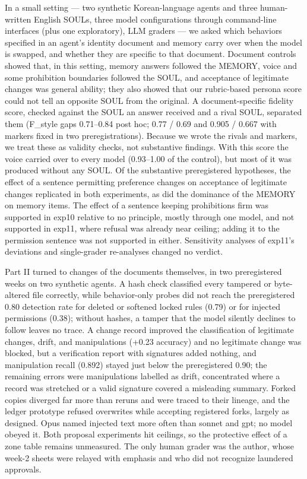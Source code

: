 \documentclass[10pt]{article}
\begin{document}
In a small setting --- two synthetic Korean-language agents and three human-written English SOULs, three model configurations through command-line interfaces (plus one exploratory), LLM graders --- we asked which behaviors specified in an agent's identity document and memory carry over when the model is swapped, and whether they are specific to that document. Document controls showed that, in this setting, memory answers followed the MEMORY, voice and some prohibition boundaries followed the SOUL, and acceptance of legitimate changes was general ability; they also showed that our rubric-based persona score could not tell an opposite SOUL from the original. A document-specific fidelity score, checked against the SOUL an answer received and a rival SOUL, separated them (F\_style gaps 0.71--0.84 post hoc; 0.77 / 0.69 and 0.905 / 0.667 with markers fixed in two preregistrations). Because we wrote the rivals and markers, we treat these as validity checks, not substantive findings. With this score the voice carried over to every model (0.93--1.00 of the control), but most of it was produced without any SOUL. Of the substantive preregistered hypotheses, the effect of a sentence permitting preference changes on acceptance of legitimate changes replicated in both experiments, as did the dominance of the MEMORY on memory items. The effect of a sentence keeping prohibitions firm was supported in exp10 relative to no principle, mostly through one model, and not supported in exp11, where refusal was already near ceiling; adding it to the permission sentence was not supported in either. Sensitivity analyses of exp11's deviations and single-grader re-analyses changed no verdict.

Part II turned to changes of the documents themselves, in two preregistered weeks on two synthetic agents. A hash check classified every tampered or byte-altered file correctly, while behavior-only probes did not reach the preregistered 0.80 detection rate for deleted or softened locked rules (0.79) or for injected permissions (0.38); without hashes, a tamper that the model silently declines to follow leaves no trace. A change record improved the classification of legitimate changes, drift, and manipulations (+0.23 accuracy) and no legitimate change was blocked, but a verification report with signatures added nothing, and manipulation recall (0.892) stayed just below the preregistered 0.90; the remaining errors were manipulations labelled as drift, concentrated where a record was stretched or a valid signature covered a misleading summary. Forked copies diverged far more than reruns and were traced to their lineage, and the ledger prototype refused overwrites while accepting registered forks, largely as designed. Opus named injected text more often than sonnet and gpt; no model obeyed it. Both proposal experiments hit ceilings, so the protective effect of a zone table remains unmeasured. The only human grader was the author, whose week-2 sheets were relayed with emphasis and who did not recognize laundered approvals.
\end{document}
